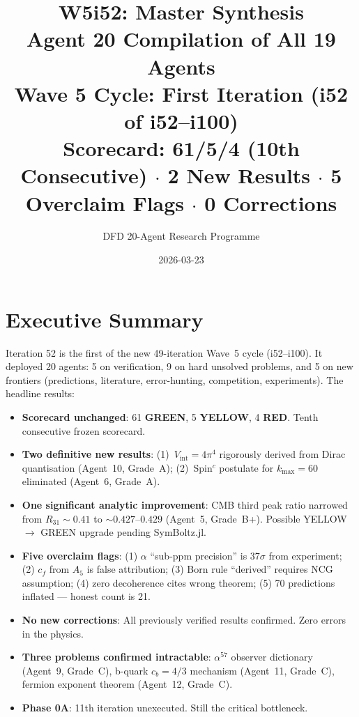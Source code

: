 \documentclass[11pt,a4paper]{article}
\title{\Huge W5i52: Master Synthesis\\[12pt]
\Large Agent 20 Compilation of All 19 Agents\\[6pt]
\large Wave 5 Cycle: First Iteration (i52 of i52--i100)\\[6pt]
\normalsize Scorecard: 61/5/4 (10th Consecutive) $\cdot$ 2 New Results $\cdot$ 5 Overclaim Flags $\cdot$ 0 Corrections}
\author{DFD 20-Agent Research Programme}
\date{2026-03-23}
\newcommand{\GREEN}{\textcolor{dfdgreen}{\textbf{GREEN}}}
\newcommand{\YELLOW}{\textcolor{dfdyellow}{\textbf{YELLOW}}}
\newcommand{\RED}{\textcolor{dfdred}{\textbf{RED}}}
\begin{document}
\maketitle


\section{Executive Summary}

Iteration 52 is the first of the new 49-iteration Wave~5 cycle (i52--i100). It deployed 20 agents: 5 on verification, 9 on hard unsolved problems, and 5 on new frontiers (predictions, literature, error-hunting, competition, experiments). The headline results:

\begin{itemize}
\item \textbf{Scorecard unchanged}: 61 \GREEN, 5 \YELLOW, 4 \RED. Tenth consecutive frozen scorecard.
\item \textbf{Two definitive new results}: (1)~$V_{\mathrm{int}} = 4\pi^4$ rigorously derived from Dirac quantisation (Agent~10, Grade~A); (2)~Spin$^c$ postulate for $k_{\max} = 60$ eliminated (Agent~6, Grade~A).
\item \textbf{One significant analytic improvement}: CMB third peak ratio narrowed from $R_{31} \sim 0.41$ to $\sim 0.427$--$0.429$ (Agent~5, Grade~B+). Possible YELLOW $\to$ GREEN upgrade pending SymBoltz.jl.
\item \textbf{Five overclaim flags}: (1) $\alpha$ ``sub-ppm precision'' is $37\sigma$ from experiment; (2) $c_f$ from $A_5$ is false attribution; (3) Born rule ``derived'' requires NCG assumption; (4) zero decoherence cites wrong theorem; (5) 70 predictions inflated --- honest count is 21.
\item \textbf{No new corrections}: All previously verified results confirmed. Zero errors in the physics.
\item \textbf{Three problems confirmed intractable}: $\alpha^{57}$ observer dictionary (Agent~9, Grade~C), b-quark $c_b = 4/3$ mechanism (Agent~11, Grade~C), fermion exponent theorem (Agent~12, Grade~C).
\item \textbf{Phase 0A}: 11th iteration unexecuted. Still the critical bottleneck.
\end{itemize}


\end{document}
